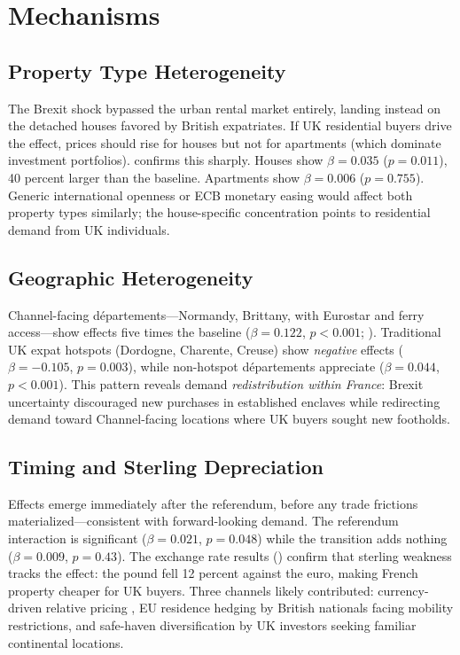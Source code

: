 \documentclass[12pt]{article}
\begin{document}
\section{Mechanisms}

\subsection{Property Type Heterogeneity}

The Brexit shock bypassed the urban rental market entirely, landing instead on the detached houses favored by British expatriates. If UK residential buyers drive the effect, prices should rise for houses but not for apartments (which dominate investment portfolios).  confirms this sharply. Houses show $\beta = 0.035$ ($p = 0.011$), 40 percent larger than the baseline. Apartments show $\beta = 0.006$ ($p = 0.755$). Generic international openness or ECB monetary easing would affect both property types similarly; the house-specific concentration points to residential demand from UK individuals.



\subsection{Geographic Heterogeneity}

Channel-facing d\'epartements---Normandy, Brittany, with Eurostar and ferry access---show effects five times the baseline ($\beta = 0.122$, $p < 0.001$; ). Traditional UK expat hotspots (Dordogne, Charente, Creuse) show \textit{negative} effects ($\beta = -0.105$, $p = 0.003$), while non-hotspot d\'epartements appreciate ($\beta = 0.044$, $p < 0.001$). This pattern reveals demand \textit{redistribution within France}: Brexit uncertainty discouraged new purchases in established enclaves while redirecting demand toward Channel-facing locations where UK buyers sought new footholds.



\subsection{Timing and Sterling Depreciation}

Effects emerge immediately after the referendum, before any trade frictions materialized---consistent with forward-looking demand. The referendum interaction is significant ($\beta = 0.021$, $p = 0.048$) while the transition adds nothing ($\beta = 0.009$, $p = 0.43$). The exchange rate results () confirm that sterling weakness tracks the effect: the pound fell 12 percent against the euro, making French property cheaper for UK buyers. Three channels likely contributed: currency-driven relative pricing \citep{bailey2018house}, EU residence hedging by British nationals facing mobility restrictions, and safe-haven diversification by UK investors seeking familiar continental locations.
\end{document}
